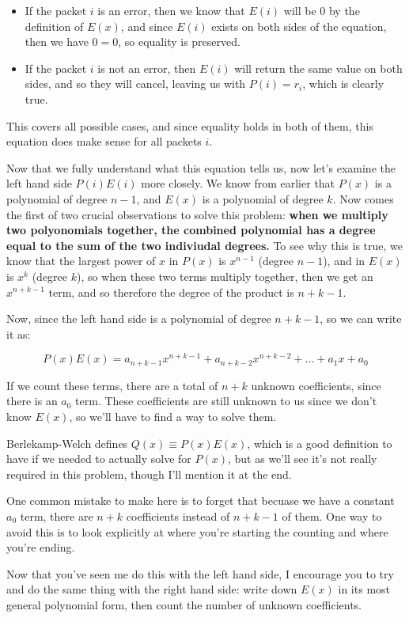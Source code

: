 \documentclass[10pt]{article}
\begin{document}
    \begin{itemize}
        \item If the packet $i$ is an error, then we know that $E(i)$ will be 0 by the definition of $E(x)$, and since $E(i)$ exists on both sides of the equation, then we have $0=0$, so equality is preserved. 
        \item If the packet $i$ is not an error, then $E(i)$ will return the same value on both sides, and so they will cancel, leaving us with $P(i) = r_i$, which is clearly true.
    \end{itemize}

    This covers all possible cases, and since equality holds in both of them, this equation does make sense for all packets $i$. 

    Now that we fully understand what this equation tells us, now let's examine the left hand side $P(i)E(i)$ more closely. We know from earlier that $P(x)$ is a polynomial of degree $n-1$, and $E(x)$ is a polynomial of degree $k$. Now comes the first of two crucial observations to solve this problem: \textbf{when we multiply two polyonomials together, the combined polynomial has a degree equal to the sum of the two indiviudal degrees.} To see why this is true, we know that the largest power of $x$ in $P(x)$ is $x^{n-1}$ (degree $n-1$), and in $E(x)$ is $x^k$ (degree $k$), so when these two terms multiply together, then we get an $x^{n+k-1}$ term, and so therefore the degree of the product is $n+k-1$. 

    Now, since the left hand side is a polynomial of degree $n+k-1$, so we can write it as:

    \[ P(x)E(x) = a_{n+k-1}x^{n+k-1} + a_{n+k-2}x^{n+k-2} + \dots + a_1x + a_0\] 

    If we count these terms, there are a total of $n+k$ unknown coefficients, since there is an $a_0$ term. These coefficients are still unknown to us since we don't know $E(x)$, so we'll have to find a way to solve them. 

    \begin{aside*}{}{}
        Berlekamp-Welch defines $Q(x) \equiv P(x)E(x)$, which is a good definition to have if we needed to actually solve for $P(x)$, but as we'll see it's not really required in this problem, though I'll mention it at the end.
    \end{aside*}

    \begin{guidance*}{}{}
        One common mistake to make here is to forget that becuase we have a constant $a_0$ term, there are $n+k$ coefficients instead of $n+k-1$ of them. One way to avoid this is to look explicitly at where you're starting the counting and where you're ending. 

        Now that you've seen me do this with the left hand side, I encourage you to try and do the same thing with the right hand side: write down $E(x)$ in its most general polynomial form, then count the number of unknown coefficients. 
    \end{guidance*}
\end{document}
